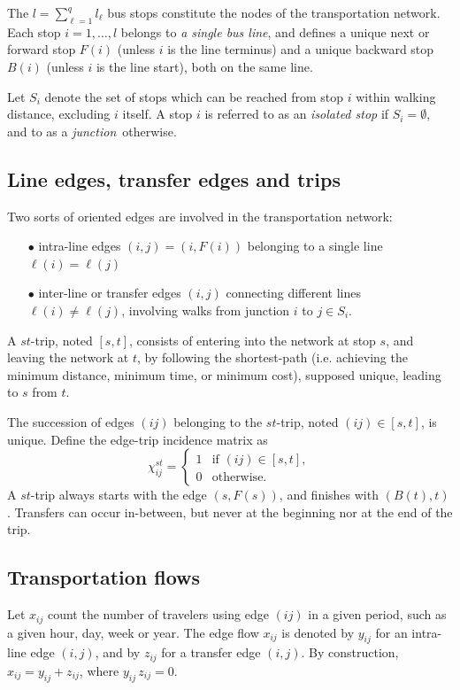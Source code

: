 \documentclass{bmcart}
\begin{document}
The $l=\sum_{\ell=1}^ql_\ell$ bus stops constitute the nodes of the transportation network. Each stop $i=1,\ldots,l$ belongs to {\em  a single bus line}, and defines a unique next or forward stop $F(i)$ (unless $i$ is the line terminus) and a unique backward stop $B(i)$ (unless $i$ is the line start), both on the same line.  

Let $S_i$ denote the set of stops which can be reached from stop $i$ within walking distance, excluding $i$ itself. A stop $i$ is referred to as an {\em isolated stop} if $S_i=\emptyset$, and to as a {\em junction} otherwise. 


\subsection{Line edges, transfer edges and trips}
\label{Line edges, transfer edges and trips}
Two sorts of oriented edges are involved in the transportation network: 
\begin{enumerate}
  \item[$\bullet$] intra-line edges $(i,j)=(i,F(i))$ belonging to a single line  $\ell(i)=\ell(j)$
  \item[$\bullet$] inter-line or transfer edges $(i,j)$ connecting different lines $\ell(i)\neq \ell(j)$, involving walks from junction $i$ to $j\in S_i$.
  \end{enumerate}
A $st$-trip, noted $[s,t]$, consists of entering into the network at stop $s$, and leaving the network at $t$, by following the shortest-path (i.e. achieving the minimum distance,  minimum time, or  minimum cost), supposed unique, leading to $s$ from $t$. 

The succession of edges $(ij)$ belonging to the $st$-trip, noted $(ij)\in [s,t]$, is unique. Define the edge-trip incidence matrix as
\begin{equation}
\label{edgetrip}
\chi_{ij}^{st} = \begin{cases}
  1    & \text{if $(ij)\in [s,t]$}, \\
  0    & \text{otherwise}.
\end{cases}
\end{equation}
A $st$-trip always starts with the edge $(s,F(s))$, and finishes with $(B(t),t)$. Transfers can occur in-between, but never at the beginning nor at the end of the trip. 

\vspace*{0.1cm}

\subsection{Transportation flows}
\label{Transportation flows}
Let  $x_{ij}$ count the number of travelers using edge $(ij)$ in a given period, such as a given hour, day, week or  year.  The edge flow $x_{ij}$ is denoted by $y_{ij}$ for an intra-line edge $(i,j)$, and 
by $z_{ij}$ for a transfer edge $(i,j)$. By construction, $x_{ij}=y_{ij}+z_{ij}$, where $y_{ij}\,  z_{ij}=0$. 
\end{document}
